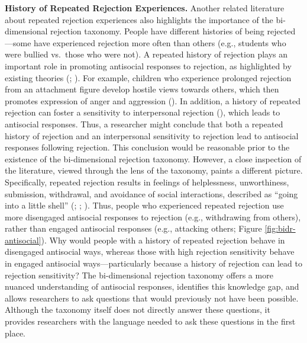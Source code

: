 \documentclass[
]{udthesis}
\begin{document}
\textbf{History of Repeated Rejection Experiences.} Another related
literature about repeated rejection experiences also highlights the
importance of the bi-dimensional rejection taxonomy. People have
different histories of being rejected---some have experienced rejection
more often than others (e.g., students who were bullied vs.~those who
were not). A repeated history of rejection plays an important role in
promoting antisocial responses to rejection, as highlighted by existing
theories (; ). For example, children who experience
prolonged rejection from an attachment figure develop hostile views
towards others, which then promotes expression of anger and aggression
(). In addition, a history of repeated
rejection can foster a sensitivity to interpersonal rejection
(), which leads to antisocial
responses. Thus, a researcher might conclude that both a repeated
history of rejection and an interpersonal sensitivity to rejection lead
to antisocial responses following rejection. This conclusion would be
reasonable prior to the existence of the bi-dimensional rejection
taxonomy. However, a close inspection of the literature, viewed through
the lens of the taxonomy, paints a different picture. Specifically,
repeated rejection results in feelings of helplessness, unworthiness,
submission, withdrawal, and avoidance of social interactions, described
as ``going into a little shell'' (; ; ). Thus, people who experienced
repeated rejection use more disengaged antisocial responses to rejection
(e.g., withdrawing from others), rather than engaged antisocial
responses (e.g., attacking others; Figure \ref{fig:bidr-antisocial}).
Why would people with a history of repeated rejection behave in
disengaged antisocial ways, whereas those with high rejection
sensitivity behave in engaged antisocial ways---particularly because a
history of rejection can lead to rejection sensitivity? The
bi-dimensional rejection taxonomy offers a more nuanced understanding of
antisocial responses, identifies this knowledge gap, and allows
researchers to ask questions that would previously not have been
possible. Although the taxonomy itself does not directly answer these
questions, it provides researchers with the language needed to ask these
questions in the first place.
\end{document}

